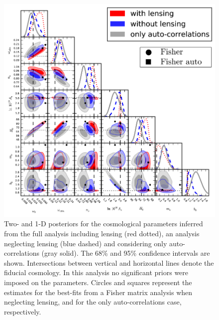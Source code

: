 \begin{figure}[bthp]
  \centering
  \includegraphics[width=\textwidth]{figures/chapter-mnu/triangle_figure_MCDM_bias_w_legend.pdf}
  \caption{Two- and 1-D posteriors for the cosmological parameters inferred from the full analysis including lensing (red dotted), an analysis neglecting lensing (blue dashed) and considering only auto-correlations (gray solid).
    The 68\% and 95\% confidence intervals are shown.
    Intersections between vertical and horizontal lines denote the fiducial cosmology.
   In this analysis no significant priors were imposed on the parameters.  Circles and squares represent the estimates for the best-fits from a Fisher matrix analysis when neglecting lensing, and for the only auto-correlations case, respectively.
  }
  \label{fig:mcmc}
\end{figure}




